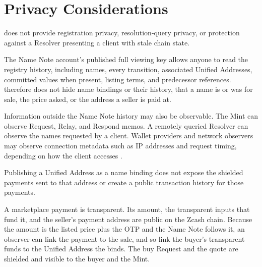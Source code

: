 \section{Privacy Considerations}
\label{sec:privacy}

\zns{} does not provide registration privacy, resolution-query privacy, or protection against a Resolver presenting a client with stale chain state.

The Name Note account's published full viewing key allows anyone to read the \zns{} registry history, including names, every transition, associated Unified Addresses, committed  values when present, listing terms, and predecessor references. \zns{} therefore does not hide name bindings or their history, that a name is or was for sale, the price asked, or the address a seller is paid at.

Information outside the Name Note history may also be observable. The Mint can observe Request, Relay, and Respond memos. A remotely queried Resolver can observe the names requested by a client. Wallet providers and network observers may observe connection metadata such as IP addresses and request timing, depending on how the client accesses \zns{}.

Publishing a Unified Address as a name binding does not expose the shielded payments sent to that address or create a public transaction history for those payments.

A marketplace payment is transparent. Its amount, the transparent inputs that fund it, and the seller's payment address are public on the Zcash chain. Because the amount is the listed price plus the OTP and the  Name Note follows it, an observer can link the payment to the sale, and so link the buyer's transparent funds to the Unified Address the  binds. The buy Request and the quote are shielded and visible to the buyer and the Mint.
